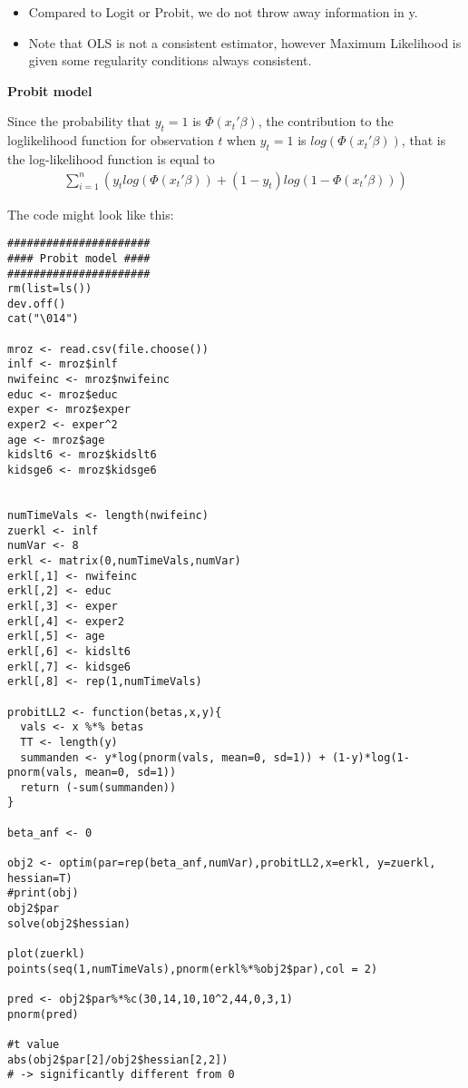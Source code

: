 \begin{Solution}{12.5}
\begin{itemize}
  \item Compared to Logit or Probit, we do not throw away information in y.
  \item Note that OLS is not a consistent estimator, however Maximum Likelihood is given some regularity conditions always consistent.

\end{itemize}
\end{Solution}
\begin{Solution}{12.6}
\textbf{Probit model}

Since the probability that $y_t=1$ is $\Phi(x_t'\beta)$, the contribution to the loglikelihood function for observation $t$ when $y_t=1$ is $log(\Phi(x_t'\beta))$, that is the log-likelihood function is equal to
\begin{align*}
\sum_{i=1}^{n} \left(y_t log(\Phi(x_t'\beta)) + (1-y_t)log(1-\Phi(x_t'\beta))\right)
\end{align*}

The code might look like this:
\begin{verbatim}
######################
#### Probit model ####
######################
rm(list=ls())
dev.off()
cat("\014")

mroz <- read.csv(file.choose())
inlf <- mroz$inlf
nwifeinc <- mroz$nwifeinc
educ <- mroz$educ
exper <- mroz$exper
exper2 <- exper^2
age <- mroz$age
kidslt6 <- mroz$kidslt6
kidsge6 <- mroz$kidsge6


numTimeVals <- length(nwifeinc)
zuerkl <- inlf
numVar <- 8
erkl <- matrix(0,numTimeVals,numVar)
erkl[,1] <- nwifeinc
erkl[,2] <- educ
erkl[,3] <- exper
erkl[,4] <- exper2
erkl[,5] <- age
erkl[,6] <- kidslt6
erkl[,7] <- kidsge6
erkl[,8] <- rep(1,numTimeVals)

probitLL2 <- function(betas,x,y){
  vals <- x %*% betas
  TT <- length(y)
  summanden <- y*log(pnorm(vals, mean=0, sd=1)) + (1-y)*log(1-pnorm(vals, mean=0, sd=1))
  return (-sum(summanden))
}

beta_anf <- 0

obj2 <- optim(par=rep(beta_anf,numVar),probitLL2,x=erkl, y=zuerkl, hessian=T)
#print(obj)
obj2$par
solve(obj2$hessian)

plot(zuerkl)
points(seq(1,numTimeVals),pnorm(erkl%*%obj2$par),col = 2)

pred <- obj2$par%*%c(30,14,10,10^2,44,0,3,1)
pnorm(pred)

#t value
abs(obj2$par[2]/obj2$hessian[2,2])
# -> significantly different from 0


\end{verbatim}
\end{Solution}
